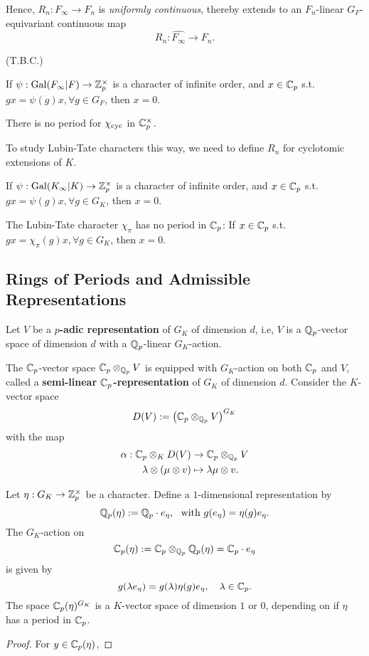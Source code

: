 Hence, $R_n : F_\infty\to F_n$ is \textit{uniformly continuous},
thereby extends to an $F_n$-linear $G_F$-equivariant continuous map
\[R_n : \widehat{F_\infty}\to F_n.\]

(T.B.C.)

\begin{theorem}
    If $\psi : \operatorname{Gal}(F_\infty|F)\to\mathbb{Z}_p^\times$
    is a character of infinite order,
    and $x\in\mathbb{C}_p$ s.t. $gx = \psi(g)x, \forall g\in G_F$, then $x = 0$.
\end{theorem}

\begin{corollary}
    There is no period for $\chi_{\mathrm{cyc}}$ in $\mathbb{C}_p^\times$.
\end{corollary}

To study Lubin-Tate characters this way, we need to define $R_n$ for cyclotomic extensions of $K$.

\begin{corollary}
    If $\psi : \operatorname{Gal}(K_\infty|K)\to\mathbb{Z}_p^\times$
    is a character of infinite order,
    and $x\in\mathbb{C}_p$ s.t. $gx = \psi(g)x, \forall g\in G_K$, then $x = 0$.
\end{corollary}

\begin{corollary}
    The Lubin-Tate character $\chi_\pi$ has no period in $\mathbb{C}_p$:
    If $x\in\mathbb{C}_p$ s.t. $gx = \chi_\pi(g)x, \forall g\in G_K$, then $x = 0$.
\end{corollary}


\subsection{Rings of Periods and Admissible Representations}

Let $V$ be a \textbf{$p$-adic representation} of $G_K$ of dimension $d$, i.e, $V$ is a $\mathbb{Q}_p$-vector space of dimension $d$ with a $\mathbb{Q}_p$-linear $G_K$-action.

The $\mathbb{C}_p$-vector space $\mathbb{C}_p\otimes_{\mathbb{Q}_p} V$ is equipped with $G_K$-action on both $\mathbb{C}_p$ and $V$,
called a \textbf{semi-linear $\mathbb{C}_p$-representation} of $G_K$ of dimension $d$.
Consider the $K$-vector space \[D(V) := \left( \mathbb{C}_p\otimes_{\mathbb{Q}_p} V  \right)^{G_K}\]
with the map \begin{align*}
    \alpha : \mathbb{C}_p\otimes_{K} D(V)&\to \mathbb{C}_p\otimes_{\mathbb{Q}_p} V\\
    \lambda\otimes(\mu\otimes v)&\mapsto \lambda\mu\otimes v.
\end{align*}


\begin{example}
Let $\eta : G_K\to\mathbb{Z}_p^\times$ be a character.
Define a $1$-dimensional representation by\[\mathbb{Q}_p(\eta) := \mathbb{Q}_p\cdot e_\eta,\ \text{ with } g(e_\eta) = \eta(g)e_\eta.\]
The $G_K$-action on \[\mathbb{C}_p(\eta) := \mathbb{C}_p\otimes_{\mathbb{Q}_p} \mathbb{Q}_p(\eta) = \mathbb{C}_p\cdot e_\eta\]
is given by \[g(\lambda e_\eta) = g(\lambda) \eta(g)e_\eta,\quad \lambda\in\mathbb{C}_p.\]
The space $\mathbb{C}_p(\eta)^{G_K}$ is a $K$-vector space of dimension $1$ or $0$, depending on if $\eta$ has a period in $\mathbb{C}_p$.

\begin{proof}
    For $y\in\mathbb{C}_p(\eta)$,
\end{proof}
\end{example}

